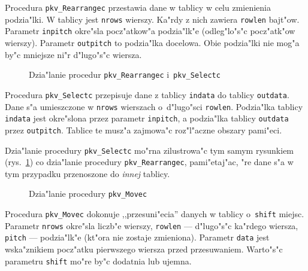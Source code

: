\vspace{\bigskipamount}
Procedura \texttt{pkv\_Rearrangec} przestawia dane w tablicy w celu
zmienienia podzia"lki. W tablicy jest \texttt{nrows} wierszy. Ka"rdy z nich
zawiera \texttt{rowlen} bajt"ow. Parametr \texttt{inpitch}
okre"sla pocz"atkow"a podzia"lk"e (odleg"lo"s"c pocz"atk"ow wierszy).
Parametr \texttt{outpitch} to podzia"lka docelowa. Obie podzia"lki nie mog"a
by"c mniejsze ni"r d"lugo"s"c wiersza.
\begin{figure}[ht]
  \centerline{}
  \caption{\label{fig:memory:1}Dzia"lanie procedur \texttt{pkv\_Rearrangec}
    i~\texttt{pkv\_Selectc}}
\end{figure}

\vspace{\bigskipamount}
Procedura \texttt{pkv\_Selectc} przepisuje dane z tablicy \texttt{indata}
do tablicy \texttt{outdata}. Dane s"a umieszczone w \texttt{nrows} wierszach
o~d"lugo"sci \texttt{rowlen}. Podzia"lka tablicy \texttt{indata} jest
okre"slona przez parametr \texttt{inpitch}, a podzia"lka tablicy
\texttt{outdata} przez \texttt{outpitch}. Tablice te musz"a zajmowa"c
roz"l"aczne obszary pami"eci.

Dzia"lanie procedury \texttt{pkv\_Selectc} mo"rna zilustrowa"c tym samym
rysunkiem (rys.~\ref{fig:memory:1}) co dzia"lanie procedury
\texttt{pkv\_Rearrangec}, pami"etaj"ac, "re
dane s"a w tym przypadku przenoszone do \emph{innej} tablicy.

\begin{figure}[ht]
  \centerline{}
  \caption{\label{fig:memory:2}Dzia"lanie procedury \texttt{pkv\_Movec}}
\end{figure}
\vspace{\bigskipamount}
Procedura \texttt{pkv\_Movec} dokonuje ,,przesuni"ecia'' danych w tablicy
o~\texttt{shift} miejsc. Parametr \texttt{nrows} okre"sla
liczb"e wierszy, \texttt{rowlen} --- d"lugo"s"c ka"rdego wiersza,
\texttt{pitch} --- podzia"lk"e (kt"ora nie zostaje zmieniona). Parametr
\texttt{data} jest wska"znikiem pocz"atku pierwszego wiersza przed
przesuwaniem. Warto"s"c parametru \texttt{shift} mo"re by"c dodatnia lub
ujemna.

